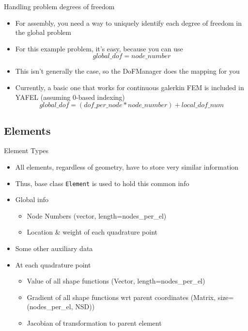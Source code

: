 \begin{frame}{Handling problem degrees of freedom}
  \begin{itemize}
  \item
    For assembly, you need a way to uniquely identify each
    degree of freedom in the global problem
  \item
    For this example problem, it's easy, because you can use
    \[
    global\_dof = node\_number
    \]
  \item
    This isn't generally the case, so the DoFManager does the mapping for you
  \item
    Currently, a basic one that works for continuous galerkin FEM
    is included in YAFEL (assuming 0-based indexing)
    \[
    global\_dof = (dof\_per\_node*node\_number) + local\_dof\_num
    \]
  \end{itemize}
\end{frame}

\subsection{Elements}
\begin{frame}{Element Types}
  \begin{itemize}
  \item
    All elements, regardless of geometry, have to store very similar information
  \item
    Thus, base class \texttt{Element} is used to hold this common info
  \item
    Global info
    \begin{itemize}
    \item
      Node Numbers (vector, length=nodes\_per\_el)
    \item
      Location \& weight of each quadrature point
    \end{itemize}
  \item
    Some other auxiliary data
  \item
    At each quadrature point
    \begin{itemize}
    \item
      Value of all shape functions (Vector, length=nodes\_per\_el)
    \item
      Gradient of all shape functions wrt parent coordinates 
      (Matrix, size=(nodes\_per\_el, NSD))
    \item
      Jacobian of transformation to parent element
    \end{itemize}
  \end{itemize}
\end{frame}

